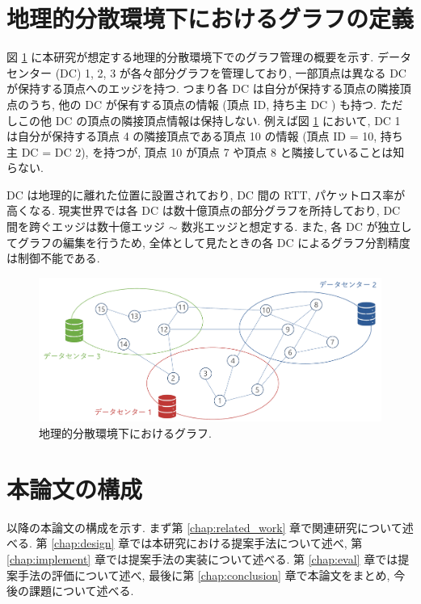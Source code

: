 \section{地理的分散環境下におけるグラフの定義}

図 \ref{地理的分散環境下におけるグラフ} に本研究が想定する地理的分散環境下でのグラフ管理の概要を示す. データセンター (DC) 1, 2, 3 が各々部分グラフを管理しており, 一部頂点は異なる DC が保持する頂点へのエッジを持つ. つまり各 DC は自分が保持する頂点の隣接頂点のうち, 他の DC が保有する頂点の情報 (頂点 ID, 持ち主 DC ) も持つ. ただしこの他 DC の頂点の隣接頂点情報は保持しない. 例えば図 \ref{地理的分散環境下におけるグラフ} において,  DC  1 は自分が保持する頂点 4 の隣接頂点である頂点 10 の情報 (頂点 ID = 10, 持ち主 DC  =  DC  2), を持つが, 頂点 10 が頂点 7 や頂点 8 と隣接していることは知らない. 

DC は地理的に離れた位置に設置されており, DC 間の RTT, パケットロス率が高くなる. 現実世界では各 DC は数十億頂点の部分グラフを所持しており, DC 間を跨ぐエッジは数十億エッジ $\sim$ 数兆エッジと想定する. また, 各 DC が独立してグラフの編集を行うため, 全体として見たときの各 DC によるグラフ分割精度は制御不能である.

\begin{figure}[t]
    \centering
    \includegraphics[scale=0.5]{figure/dcgraph.pdf}
    \caption{地理的分散環境下におけるグラフ.}
    \label{地理的分散環境下におけるグラフ}
\end{figure}

\section{本論文の構成}

以降の本論文の構成を示す. まず第 \ref{chap:related_work} 章で関連研究について述べる. 第 \ref{chap:design} 章では本研究における提案手法について述べ, 第 \ref{chap:implement} 章では提案手法の実装について述べる. 第 \ref{chap:eval} 章では提案手法の評価について述べ, 最後に第 \ref{chap:conclusion} 章で本論文をまとめ, 今後の課題について述べる. 